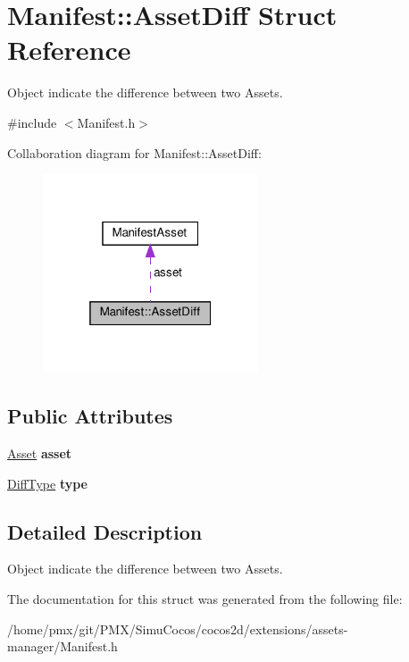 \hypertarget{structManifest_1_1AssetDiff}{}\section{Manifest\+:\+:Asset\+Diff Struct Reference}
\label{structManifest_1_1AssetDiff}


Object indicate the difference between two Assets.  




{\ttfamily \#include $<$Manifest.\+h$>$}



Collaboration diagram for Manifest\+:\+:Asset\+Diff\+:
\nopagebreak
\begin{figure}[H]
\begin{center}
\leavevmode
\includegraphics[width=181pt]{structManifest_1_1AssetDiff__coll__graph}
\end{center}
\end{figure}
\subsection*{Public Attributes}
\begin{DoxyCompactItemize}
\item 
\mbox{\label{structManifest_1_1AssetDiff_a6b334a5ae94f530ff11a1ec0917e22a4}} 
\hyperlink{structManifest_1_1Asset}{Asset} {\bfseries asset}
\item 
\mbox{\label{structManifest_1_1AssetDiff_af4908fae85d021c0e89f36e5c9e6e3d2}} 
\hyperlink{classManifest_a0d036780e84e6ef32c9431acd5f9fdc7}{Diff\+Type} {\bfseries type}
\end{DoxyCompactItemize}


\subsection{Detailed Description}
Object indicate the difference between two Assets. 

The documentation for this struct was generated from the following file\+:\begin{DoxyCompactItemize}
\item 
/home/pmx/git/\+P\+M\+X/\+Simu\+Cocos/cocos2d/extensions/assets-\/manager/Manifest.\+h\end{DoxyCompactItemize}
